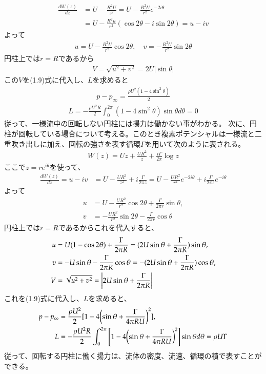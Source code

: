 \documentclass[10pt,b5paper,papersize,dvipdfmx]{jsbook}
\begin{document}
\begin{align}
  \frac{dW(z)}{dz}
  &= U - \frac{R^2U}{z^2}
  = U - \frac{R^2U}{r^2}e^{-2i\theta} \\
  &= U - \frac{R^2u}{r^2}(\cos2\theta - i\sin2\theta)
  = u - iv
\end{align}
よって
\begin{align}
  u = U - \frac{R^2U}{r^2} \cos2\theta,\quad
  v = -\frac{R^2U}{r^2} \sin2\theta
\end{align}
円柱上では$r = R$であるから
\begin{align}
  V = \sqrt{u^2+v^2}
    = 2U|\sin\theta|
\end{align}
この$V$を(1.9)式に代入し、$L$を求めると
\begin{align}
  p - p_\infty = \frac{\rho U^2(1 - 4\sin^2\theta)}{2}
\end{align}
\begin{align}
  L = -\frac{\rho U^2R}{2} \int_0^{2\pi} (1 - 4\sin^2\theta) \sin\theta d\theta 
    = 0
\end{align}
従って、一様流中の回転しない円柱には揚力は働かない事がわかる。
次に、円柱が回転している場合について考える。このとき複素ポテンシャルは一様流と二重吹き出しに加え、回転の強さを表す循環$\Gamma$を用いて次のように表される。
\begin{align}
  W(z) = Uz + \frac{UR^2}{z} + \frac{i\Gamma}{2\pi} \log z
\end{align}
ここで$z=re^{i\theta}$を使って、
\begin{align}
  \frac{dW(z)}{dz}
  = u - iv
  &= U - \frac{UR^2}{z^2} + i\frac{\Gamma}{2\pi z}
  = U - \frac{UR^2}{r^2}e^{-2i\theta} + i\frac{\Gamma}{2\pi z}e^{-i\theta}
\end{align}
よって
\begin{align}
  u &= U - \frac{UR^2}{r^2}\cos 2\theta + \frac{\Gamma}{2\pi r}\sin\theta,\\
  v &= -\frac{UR^2}{r^2}\sin 2\theta - \frac{\Gamma}{2\pi r}\cos\theta
\end{align}
円柱上では$r = R$であるからこれを代入すると、
\begin{align}
  u &= U(1 - \cos 2\theta) + \frac{\Gamma}{2\pi R}
    = (2U\sin\theta + \frac{\Gamma}{2\pi R})\sin\theta,\\
  v &= -U\sin\theta - \frac{\Gamma}{2\pi R}\cos\theta
    = -(2U\sin\theta + \frac{\Gamma}{2\pi R})\cos\theta,\\
  V &= \sqrt{u^2 + v^2} = \qty|2U\sin\theta + \frac{\Gamma}{2\pi R}|
\end{align}
これを(1.9)式に代入し、$L$を求めると、
\begin{align}
  p - p_\infty &= \frac{\rho U^2}{2}[1 - 4\qty(\sin\theta + \frac{\Gamma}{4\pi RU})^2],\\
  L &= -\frac{\rho U^2R}{2}\int_0^{2\pi} \qty[1 - 4\qty(\sin\theta + \frac{\Gamma}{4\pi RU})^2]\sin\theta d\theta %
    = \rho U\Gamma
\end{align}
従って、回転する円柱に働く揚力は、流体の密度、流速、循環の積で表すことができる。
\end{document}

